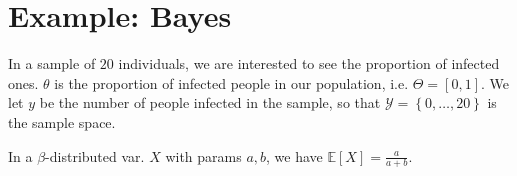 \documentclass[a4paper, 12pt]{article}
\begin{document}
\section{Example: Bayes}

In a sample of $20$ individuals, we are interested to see the proportion of
infected ones. $\theta$ is the proportion of infected people in our population,
i.e. $\Theta  = [0, 1]$. We let $y$ be the number of people infected in the
sample, so that $\mathcal{Y} = \left\{ 0, \ldots, 20 \right\} $ is the sample
space.

In a $\beta$-distributed var. $X$ with params $a, b$, we have $\mathbb{E}\left[ X \right] =
\frac{a}{a+b}$.
\end{document}
